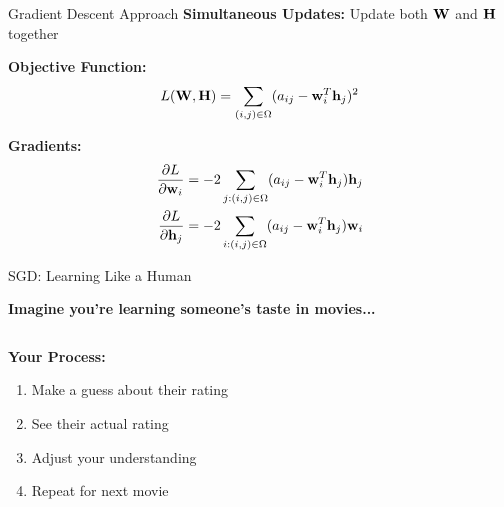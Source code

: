 \documentclass{beamer}
\begin{document}
\begin{frame}{Gradient Descent Approach}
\textbf{Simultaneous Updates:} Update both $\mathbf{W}$ and $\mathbf{H}$ together

\pause
\textbf{Objective Function:}
\begin{equation*}
L(\mathbf{W}, \mathbf{H}) = \sum_{(i,j) \in \Omega} (a_{ij} - \mathbf{w}_i^T \mathbf{h}_j)^2
\end{equation*}

\pause
\textbf{Gradients:}
\begin{align}
\frac{\partial L}{\partial \mathbf{w}_i} &= -2 \sum_{j: (i,j) \in \Omega} (a_{ij} - \mathbf{w}_i^T \mathbf{h}_j) \mathbf{h}_j \\
\frac{\partial L}{\partial \mathbf{h}_j} &= -2 \sum_{i: (i,j) \in \Omega} (a_{ij} - \mathbf{w}_i^T \mathbf{h}_j) \mathbf{w}_i
\end{align}
\end{frame}

\begin{frame}{SGD: Learning Like a Human}
\begin{center}
\textbf{Imagine you're learning someone's taste in movies...}
\end{center}

\pause
\begin{columns}[T]
\begin{column}{0.5\textwidth}
\textbf{Your Process:}
\begin{enumerate}[<+->]
    \item Make a guess about their rating
    \item See their actual rating
    \item Adjust your understanding
    \item Repeat for next movie
\end{enumerate}
\end{column}
\begin{column}{0.5\textwidth}
\end{column}
\end{columns}
\end{frame}
\end{document}

